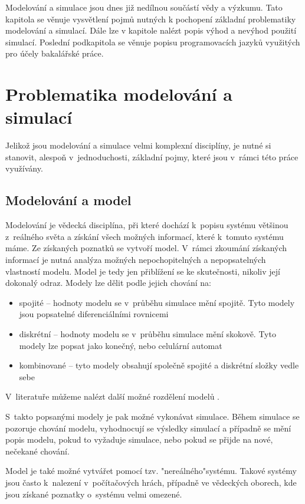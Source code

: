 Modelování a simulace jsou dnes již nedílnou součástí vědy a výzkumu. Tato kapitola se věnuje vysvětlení pojmů nutných k pochopení základní problematiky modelování a simulací. Dále lze v kapitole nalézt popis výhod a nevýhod použití simulací. Poslední podkapitola se věnuje popisu programovacích jazyků využitých pro účely bakalářské práce.

\section{Problematika modelování a simulací}
Jelikož jsou modelování a simulace velmi komplexní disciplíny, je nutné si stanovit, alespoň v~jednoduchosti, základní pojmy, které jsou v~rámci této práce využívány.

\subsection{Modelování a model}
\label{modelovani}
Modelování je vědecká disciplína, při které dochází k~popisu systému většinou z~reálného světa a získání všech možných informací, které k~tomuto systému máme. Ze získaných poznatků se vytvoří model. V~rámci zkoumání získaných informací je nutná analýza možných nepochopitelných a nepopsatelných vlastností modelu. Model je tedy jen přiblížení se ke skutečnosti, nikoliv její dokonalý odraz. Modely lze dělit podle jejich chování na:

\begin{itemize}
    \item spojité -- hodnoty modelu se v~průběhu simulace mění spojitě. Tyto modely jsou popsatelné diferenciálními rovnicemi
    \item diskrétní -- hodnoty modelu se v~průběhu simulace mění skokově. Tyto modely lze popsat jako konečný, nebo celulární automat
    \item kombinované -- tyto modely obsahují společně spojité a diskrétní složky vedle sebe
\end{itemize}

V~literatuře můžeme nalézt další možné rozdělení modelů \cite{IMS-skripta}.
\newline

S~takto popsanými modely je pak možné vykonávat simulace. Během simulace se pozoruje chování modelu, vyhodnocují se výsledky simulací a případně se mění popis modelu, pokud to vyžaduje simulace, nebo pokud se přijde na nové, nečekané chování.

Model je také možné vytvářet pomocí tzv. "nereálného"\space systému. Takové systémy jsou často k~nalezení v~počítačových hrách, případně ve vědeckých oborech, kde jsou získané poznatky o~systému velmi omezené.

